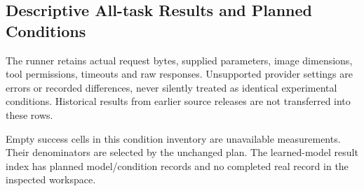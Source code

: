\documentclass[10pt,letterpaper]{article}
\begin{document}
\begin{table}[h]
\centering\small
\caption{Core visual families; condition-specific answerability pending.}

\end{table}
\begin{table}[h]
\centering\small
\caption{Structural evidence families; deletion results require
the node-count baseline and paired comparisons.}

\end{table}
\begin{table}[h]
\centering\small
\caption{Nonconstant controls, independently reported.}

\end{table}
\begin{table}[h]
\centering\small
\caption{Constant controls. They measure scope or interface compliance
and cannot decide a primary capability ranking.}

\end{table}

\clearpage
\subsection{Descriptive All-task Results and Planned Conditions}
\begin{table}[h]
\centering\small
\caption{All-task descriptive scores, not an overall assembly capability
ranking. Configurations are planned, not confirmed service availability.
Exact checkpoint/API revisions must be frozen before live inference.}

\end{table}
\begin{center}\small\end{center}
The runner retains actual request bytes, supplied parameters, image
dimensions, tool permissions, timeouts and raw responses. Unsupported
provider settings are errors or recorded differences, never silently
treated as identical experimental conditions. Historical results from
earlier source releases are not transferred into these rows.
\begin{center}\small\end{center}
Empty success cells in this condition inventory are unavailable
measurements. Their denominators are selected by the unchanged plan.
The learned-model result index has \EvPlannedRuns{} planned model/condition records
and no completed real record in the inspected workspace.
\end{document}
